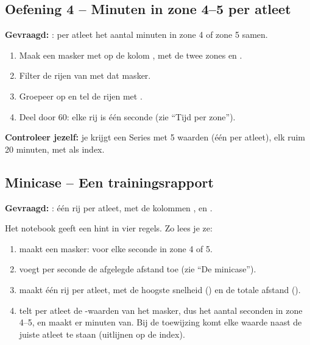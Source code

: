 \documentclass[11pt,a4paper]{article}
\begin{document}
\subsection*{Oefening 4 -- Minuten in zone 4--5 per atleet}

\textbf{Gevraagd:} : per atleet het aantal
minuten in zone 4 of zone 5 samen.

\begin{enumerate}
  \item Maak een masker met  op de kolom
        , met de twee zones  en
        .
  \item Filter de rijen van  met dat masker.
  \item Groepeer op  en tel de rijen met .
  \item Deel door 60: elke rij is één seconde (zie ``Tijd per zone'').
\end{enumerate}

\textbf{Controleer jezelf:} je krijgt een Series met 5 waarden (één per
atleet), elk ruim 20 minuten, met  als index.

\subsection*{Minicase -- Een trainingsrapport}

\textbf{Gevraagd:} : één rij per atleet, met de
kolommen ,  en
.

Het notebook geeft een hint in vier regels. Zo lees je ze:

\begin{enumerate}
  \item {} maakt een
        masker:  voor elke seconde in zone 4 of 5.
  \item {}
        voegt per seconde de afgelegde afstand toe (zie ``De minicase'').
  \item {} maakt één rij per atleet,
        met de hoogste snelheid () en de totale afstand
        ().
  \item {}
        telt per atleet de -waarden van het masker, dus het
        aantal seconden in zone 4--5, en maakt er minuten van. Bij de
        toewijzing komt elke waarde naast de juiste atleet te staan
        (uitlijnen op de index).
\end{enumerate}
\end{document}
